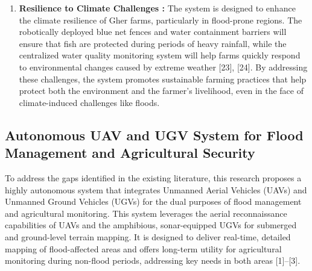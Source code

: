 \documentclass[conference]{IEEEtran}
\begin{document}
\begin{enumerate}
	
	\item \textbf{Resilience to Climate Challenges : }
	The system is designed to enhance the climate resilience of Gher farms, particularly in flood-prone regions. The robotically deployed blue net fences and water containment barriers will ensure that fish are protected during periods of heavy rainfall, while the centralized water quality monitoring system will help farms quickly respond to environmental changes caused by extreme weather [23], [24]. By addressing these challenges, the system promotes sustainable farming practices that help protect both the environment and the farmer’s livelihood, even in the face of climate-induced challenges like floods.
	
\end{enumerate}


\subsection{\textbf{Autonomous UAV and UGV System for Flood Management and Agricultural Security}}
To address the gaps identified in the existing literature, this research proposes a highly autonomous system that integrates Unmanned Aerial Vehicles (UAVs) and Unmanned Ground Vehicles (UGVs) for the dual purposes of flood management and agricultural monitoring. This system leverages the aerial reconnaissance capabilities of UAVs and the amphibious, sonar-equipped UGVs for submerged and ground-level terrain mapping. It is designed to deliver real-time, detailed mapping of flood-affected areas and offers long-term utility for agricultural monitoring during non-flood periods, addressing key needs in both areas [1]–[3].
\end{document}
